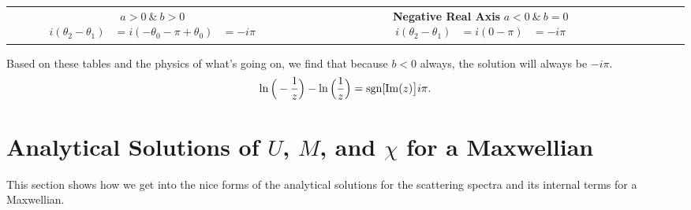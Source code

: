 \begin{table}[H]
\begin{tabular}{c|c|c|c}
{			$a>0\ \&\ b > 0$ \\
			$\begin{aligned}
				i(\theta_2-\theta_1)
				&= i(-\theta_0-\pi+\theta_0)\\
				&= -i\pi 
			\end{aligned} $} 
		&
		\makecell[t]{\textbf{Negative Real Axis}\\
			$a< 0\ \&\ b = 0$ \\
			$\begin{aligned}
				i(\theta_2-\theta_1) 
				&= i(0-\pi) \\
				&= -i \pi
			\end{aligned}$}
	\end{tabular}
\end{table}

Based on these tables and the physics of what's going on, 
we find that because $b<0$ always, the solution will always be
$-i\pi$.
%
\begin{equation}
	\ln\Big(-\frac{1}{z}\Big) - \ln\Big(\frac{1}{z}\Big) = \operatorname{sgn}[\operatorname{Im}(z)\big] i \pi.
\end{equation}



\section{Analytical Solutions of $U$, $M$, and $\chi$ for a Maxwellian}
\label{a:spectra}
This section shows how we get into the nice forms of the analytical solutions for the scattering spectra
and its internal terms for a Maxwellian.

